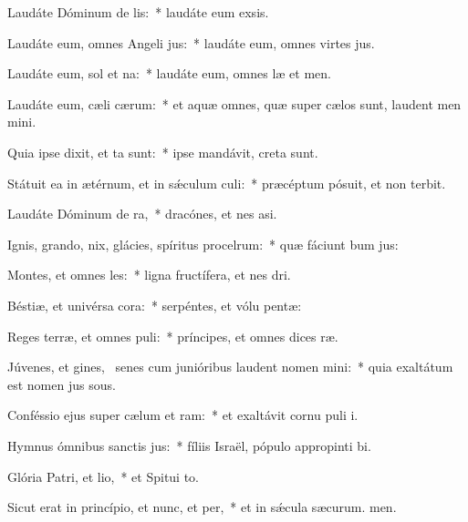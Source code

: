 \item Laudáte Dóminum de lis:~* laudáte eum  exsis.
\item Laudáte eum, omnes Angeli jus:~* laudáte eum, omnes virtes jus.
\item Laudáte eum, sol et na:~* laudáte eum, omnes læ et men.
\item Laudáte eum, cæli cærum:~* et aquæ omnes, quæ super cælos sunt, laudent men mini.
\item Quia ipse dixit, et ta sunt:~* ipse mandávit,  creta sunt.
\item Státuit ea in ætérnum, et in sǽculum culi:~* præcéptum pósuit, et non terbit.
\item Laudáte Dóminum de ra,~* dracónes, et nes asi.
\item Ignis, grando, nix, glácies, spíritus procelrum:~* quæ fáciunt bum jus:
\item Montes, et omnes les:~* ligna fructífera, et nes dri.
\item Béstiæ, et univérsa cora:~* serpéntes, et vólu pentæ:
\item Reges terræ, et omnes puli:~* príncipes, et omnes dices ræ.
\item Júvenes, et gines,~\pscross{} senes cum junióribus laudent nomen mini:~* quia exaltátum est nomen jus sous.
\item Conféssio ejus super cælum et ram:~* et exaltávit cornu puli i.
\item Hymnus ómnibus sanctis jus:~* fíliis Israël, pópulo appropinti bi.
\item Glória Patri, et lio,~* et Spitui to.
\item Sicut erat in princípio, et nunc, et per,~* et in sǽcula sæcurum. men.
